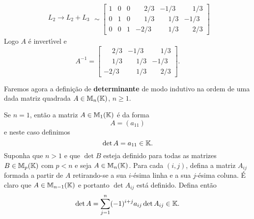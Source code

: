 \begin{exemplo}
\begin{solucao}
\begin{align*}
\begin{array}{l}
		    		L_2 \to L_2 + L_3\\
				\end{array} \sim
				\left[
					\begin{array}{ccc|ccc}
						1 & 0 & 0 & \phantom{-}2/3 & -1/3 & \phantom{-}1/3 \\
						0 & 1 & 0 & \phantom{-}1/3 & \phantom{-}1/3 & -1/3\\
						0 & 0 & 1 & -2/3 & \phantom{-}1/3 & \phantom{-}2/3
					\end{array}
				\right]
		\end{align*}
		Logo $A$ \'e invert{\'\i}vel e
		\[
			A^{-1} =
			\begin{bmatrix}
				\phantom{-}2/3 & -1/3 & \phantom{-}1/3 \\
				\phantom{-}1/3 & \phantom{-}1/3 & -1/3\\
				-2/3 & \phantom{-}1/3 & \phantom{-}2/3
			\end{bmatrix}.
		\]
	\end{solucao}
\end{exemplo}

Faremos agora a defini\c{c}\~ao de \textbf{determinante} de modo indutivo na ordem de uma dada matriz quadrada $A \in \mathbb{M}_n(\mathbb{K})$, $n \ge 1$.

Se $n = 1$, ent\~ao a matriz $A \in \mathbb{M}_1(\mathbb{K})$ \'e da forma
\[
	A = (a_{11})
\]
e neste caso definimos
\[
	\det A = a_{11} \in \mathbb{K}.
\]
Suponha que $n > 1$ e que $\det B$ esteja definido para todas as matrizes  $B \in \mathbb{M}_p(\mathbb{K})$ com $p < n$ e seja
$A \in \mathbb{M}_n(\mathbb{K})$. Para cada $(i,j)$, defina a matriz $A_{ij}$ formada a partir de $A$ retirando-se a sua $i$-\'esima linha e a sua $j$-\'esima coluna. \'E claro que $A \in \mathbb{M}_{n - 1}(\mathbb{K})$ e portanto $\det A_{ij}$ est\'a definido. Defina ent\~ao
\[
	\det A = \sum_{j = 1}^n(-1)^{i + j}a_{ij}\det A_{ij} \in \mathbb{K}.
\]

